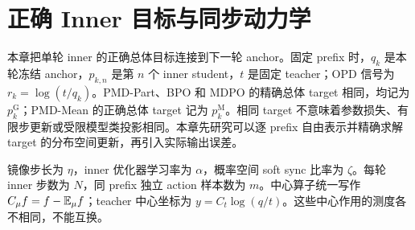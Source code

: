 \chapter{正确 Inner 目标与同步动力学}
\label{dyn:chapter}

本章把单轮 inner 的正确总体目标连接到下一轮 anchor。固定 prefix 时，$q_k$ 是本轮冻结 anchor，$p_{k,n}$ 是第 $n$ 个 inner student，$t$ 是固定 teacher；OPD 信号为 $r_k=\log(t/q_k)$。PMD-Part、BPO 和 MDPO 的精确总体 target 相同，均记为 $p_k^{\mathrm G}$；PMD-Mean 的正确总体 target 记为 $p_k^{\mathrm M}$。相同 target 不意味着参数损失、有限步更新或受限模型类投影相同。本章先研究可以逐 prefix 自由表示并精确求解 target 的分布空间更新，再引入实际输出误差。

镜像步长为 $\eta$，inner 优化器学习率为 $\alpha$，概率空间 soft sync 比率为 $\zeta$。每轮 inner 步数为 $N$，同 prefix 独立 action 样本数为 $m$。中心算子统一写作 $C_\mu f=f-\mathbb E_\mu f$；teacher 中心坐标为 $y=C_t\log(q/t)$。这些中心作用的测度各不相同，不能互换。








